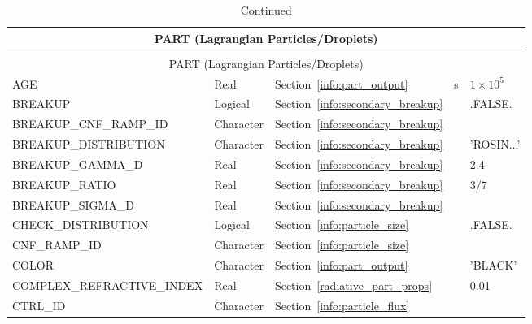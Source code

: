 \documentclass[11pt]{book}
\begin{document}
\begin{longtable}{@{\extracolsep{\fill}}|l|l|l|l|l|}
\caption[Lagrangian particles ({\ct PART} namelist group)]{For more information see Chapter~\ref{info:PART}.}
\label{tbl:PART} \\
\hline
\multicolumn{5}{|c|}{{\ct PART} (Lagrangian Particles/Droplets)} \\
\hline \hline
\endfirsthead
\caption[]{Continued} \\
\hline
\multicolumn{5}{|c|}{{\ct PART} (Lagrangian Particles/Droplets)} \\
\hline \hline
\endhead
{\ct AGE}                                & Real            & Section~\ref{info:part_output}          & s         & $1\times 10^5$ \\ \hline
{\ct BREAKUP}                            & Logical         & Section~\ref{info:secondary_breakup}    &           & {\ct .FALSE.} \\ \hline
{\ct BREAKUP\_CNF\_RAMP\_ID}             & Character       & Section~\ref{info:secondary_breakup}    &           &               \\ \hline
{\ct BREAKUP\_DISTRIBUTION}              & Character       & Section~\ref{info:secondary_breakup}    &           & {\ct 'ROSIN...'} \\ \hline
{\ct BREAKUP\_GAMMA\_D}                  & Real            & Section~\ref{info:secondary_breakup}    &           & 2.4           \\ \hline
{\ct BREAKUP\_RATIO}                     & Real            & Section~\ref{info:secondary_breakup}    &           & $3/7$         \\ \hline
{\ct BREAKUP\_SIGMA\_D}                  & Real            & Section~\ref{info:secondary_breakup}    &           &               \\ \hline
{\ct CHECK\_DISTRIBUTION}                & Logical         & Section~\ref{info:particle_size}        &           & {\ct .FALSE.} \\ \hline
{\ct CNF\_RAMP\_ID}                      & Character       & Section~\ref{info:particle_size}        &           &               \\ \hline
{\ct COLOR}                              & Character       & Section~\ref{info:part_output}          &           & {\ct 'BLACK'} \\ \hline
{\ct COMPLEX\_REFRACTIVE\_INDEX}         & Real            & Section~\ref{radiative_part_props}      &           & 0.01          \\ \hline
{\ct CTRL\_ID}                           & Character       & Section~\ref{info:particle_flux}        &           &               \\ \hline

\end{longtable}
\end{document}
